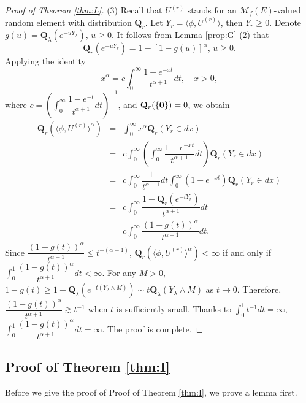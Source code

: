 \documentclass[12pt,a4paper]{amsart}
\numberwithin{equation}{section}
\theoremstyle{plain}
\theoremstyle{definition}
\theoremstyle{remark}
\begin{document}
\begin{proof}[Proof of Theorem \ref{thm:L}]
(3)
Recall that $U^{(r)}$ stands for an $\mathcal M_f(E)$-valued random element with distribution $\mathbf Q_r$. Let $Y_r=\langle\phi, U^{(r)}\rangle$, then $Y_r\geq 0$.
Denote $g(u)=\mathbf Q_\lambda\left(e^{-uY_\lambda}\right),\, u\geq 0$. 
It follows from Lemma \ref{prop:G} (2) that
$$
\mathbf Q_r\left(e^{-uY_r}\right)=1-[1-g(u)]^\alpha,\, u\geq 0.
$$
Applying the identity%
\[
x^\alpha=c\int_0^\infty\dfrac{1-e^{-xt}}{t^{\alpha+1}}dt,
\quad x>0,
\]
where $c=\left(\int_0^\infty\dfrac{1-e^{-t}}{t^{\alpha+1}}dt\right)^{-1}$, and $\mathbf Q_r(\{{\bf 0}\})=0$, we obtain
\begin{eqnarray*}
\mathbf Q_r(\langle\phi, U^{(r)}\rangle^{\alpha})&=&\int_0^\infty x^\alpha \mathbf Q_r(Y_r\in dx)\\
&=&c\int_0^\infty \left(\int_0^\infty\dfrac{1-e^{-xt}}{t^{\alpha+1}}dt \right)\mathbf Q_r(Y_r\in dx)\\
&=&c\int_0^\infty\dfrac{1}{t^{\alpha+1}}dt\int_0^\infty\left(1-e^{-xt}\right)\mathbf Q_r(Y_r\in dx)\\
&=&c\int_0^\infty\dfrac{1-\mathbf Q_r\left(e^{-tY_r}\right)}{t^{\alpha+1}}dt\\
&=&c\int_0^\infty\dfrac{(1-g(t))^\alpha}{t^{\alpha+1}}dt.
\end{eqnarray*}
Since $\dfrac{(1-g(t))^\alpha}{t^{\alpha+1}}\leq t^{-(\alpha+1)}$, $\mathbf Q_r(\langle\phi, U^{(r)}\rangle^{\alpha})<\infty$ if and only if $\int_0^1\dfrac{(1-g(t))^\alpha}{t^{\alpha+1}}dt<\infty$.
For any $M>0$, $1-g(t)\geq 1-\mathbf Q_\lambda\left(e^{-t(Y_\lambda\wedge M)}\right)\sim t \mathbf Q_\lambda(Y_\lambda\wedge M)$ as $t\to 0$. Therefore,
$\dfrac{(1-g(t))^\alpha}{t^{\alpha+1}}\gtrsim t^{-1}$ when $t$ is sufficiently small.  Thanks to $\int_0^1 t^{-1}dt=\infty$,
$\int_0^1\dfrac{(1-g(t))^\alpha}{t^{\alpha+1}}dt=\infty$. The proof is complete.
\end{proof}

\subsection{Proof of Theorem \ref{thm:I}}
Before we give the proof of Proof of Theorem \ref{thm:I}, we prove a lemma first.
\end{document}
